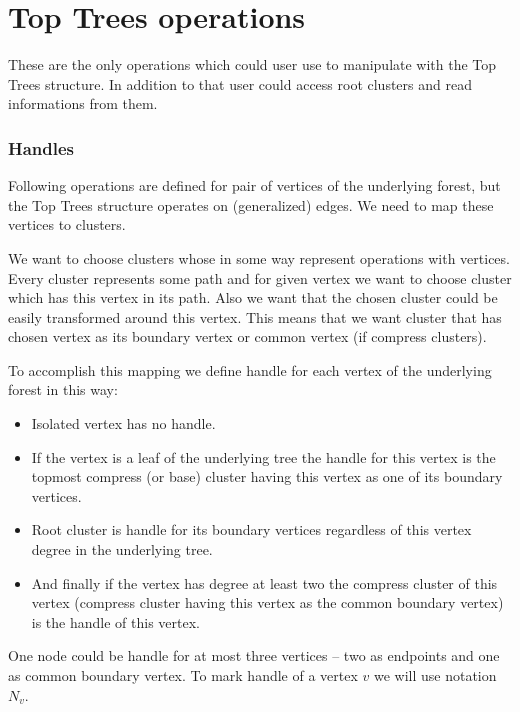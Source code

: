 

\section{Top Trees operations}

These are the only operations which could user use to manipulate with the Top
Trees structure. In addition to that user could access root clusters and read
informations from them.

\subsubsection{Handles}

Following operations are defined for pair of vertices of the underlying forest,
but the Top Trees structure operates on (generalized) edges. We need to map
these vertices to clusters.

We want to choose clusters whose in some way represent operations with
vertices. Every cluster represents some path and for given vertex we want to
choose cluster which has this vertex in its path. Also we want that the chosen
cluster could be easily transformed around this vertex. This means that we want
cluster that has chosen vertex as its boundary vertex or common vertex
(if compress clusters).

To accomplish this mapping we define {\I handle} for each vertex of the
underlying forest in this way:

\begin{itemize}
\item Isolated vertex has no handle.
\item If the vertex is a leaf of the underlying tree the
handle for this vertex is the topmost compress (or base) cluster having this
vertex as one of its boundary vertices.
\item Root cluster is handle for its boundary vertices regardless of this vertex
degree in the underlying tree.
\item And finally if the vertex has degree at least two the compress cluster of
this vertex (compress cluster having this vertex as the common boundary vertex)
is the handle of this vertex.
\end{itemize}

One node could be handle for at most three vertices -- two as endpoints and one
as common boundary vertex. To mark handle of a vertex $v$ we will use notation
$N_v$.

